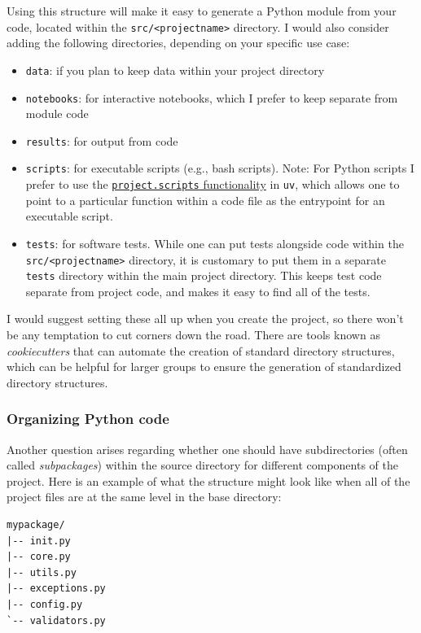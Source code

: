 Using this structure will make it easy to generate a Python module from your code, located within the \texttt{src/\textless projectname\textgreater } directory.  I would also consider adding the following directories, depending on your specific use case:

\begin{itemize}
\item \texttt{data}: if you plan to keep data within your project directory
\item \texttt{notebooks}: for interactive notebooks, which I prefer to keep separate from module code
\item \texttt{results}: for output from code
\item \texttt{scripts}: for executable scripts (e.g., bash scripts). Note: For Python scripts I prefer to use the \href{https://docs.astral.sh/uv/guides/scripts/}{\texttt{project.scripts} functionality} in \texttt{uv}, which allows one to point to a particular function within a code file as the entrypoint for an executable script.
\item \texttt{tests}: for software tests. While one can put tests alongside code within the \texttt{src/\textless projectname\textgreater } directory, it is customary to put them in a separate \texttt{tests} directory within the main project directory.  This keeps test code separate from project code, and makes it easy to find all of the tests.
\end{itemize}

I would suggest setting these all up when you create the project, so there won't be any temptation to cut corners down the road.  There are tools known as \textit{cookiecutters} that can automate the creation of standard directory structures, which can be helpful for larger groups to ensure the generation of standardized directory structures.

\subsubsection{Organizing Python code}

Another question arises regarding whether one should have subdirectories (often called \textit{subpackages}) within the source directory for different components of the project.  Here is an example of what the structure might look like when all of the project files are at the same level in the base directory:

\begin{lstlisting}[style=shell]
mypackage/
|-- init.py
|-- core.py
|-- utils.py
|-- exceptions.py
|-- config.py
`-- validators.py
\end{lstlisting}

